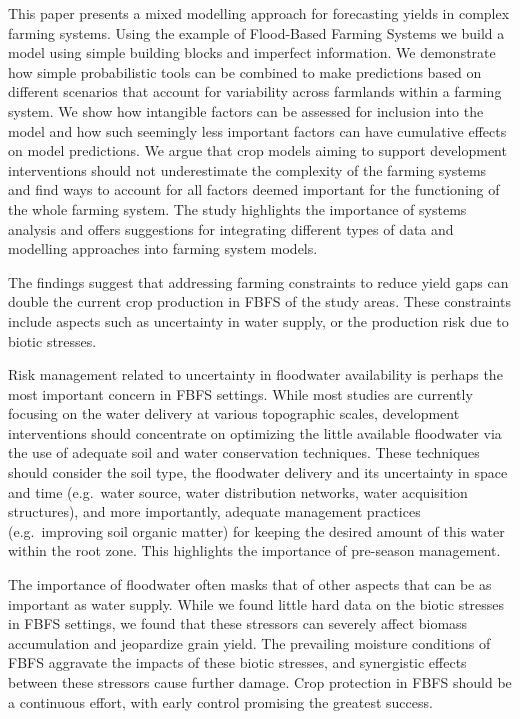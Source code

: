 \documentclass[]{elsarticle} %
\begin{document}
This paper presents a mixed modelling approach for forecasting yields in complex farming systems. Using the example of Flood-Based Farming Systems we build a model using simple building blocks and imperfect information. We demonstrate how simple probabilistic tools can be combined to make predictions based on different scenarios that account for variability across farmlands within a farming system. We show how intangible factors can be assessed for inclusion into the model and how such seemingly less important factors can have cumulative effects on model predictions. We argue that crop models aiming to support development interventions should not underestimate the complexity of the farming systems and find ways to account for all factors deemed important for the functioning of the whole farming system. The study highlights the importance of systems analysis and offers suggestions for integrating different types of data and modelling approaches into farming system models.

The findings suggest that addressing farming constraints to reduce yield gaps can double the current crop production in FBFS of the study areas. These constraints include aspects such as uncertainty in water supply, or the production risk due to biotic stresses.

Risk management related to uncertainty in floodwater availability is perhaps the most important concern in FBFS settings. While most studies are currently focusing on the water delivery at various topographic scales, development interventions should concentrate on optimizing the little available floodwater via the use of adequate soil and water conservation techniques. These techniques should consider the soil type, the floodwater delivery and its uncertainty in space and time (e.g.~water source, water distribution networks, water acquisition structures), and more importantly, adequate management practices (e.g.~improving soil organic matter) for keeping the desired amount of this water within the root zone. This highlights the importance of pre-season management.

The importance of floodwater often masks that of other aspects that can be as important as water supply. While we found little hard data on the biotic stresses in FBFS settings, we found that these stressors can severely affect biomass accumulation and jeopardize grain yield. The prevailing moisture conditions of FBFS aggravate the impacts of these biotic stresses, and synergistic effects between these stressors cause further damage. Crop protection in FBFS should be a continuous effort, with early control promising the greatest success.
\end{document}
